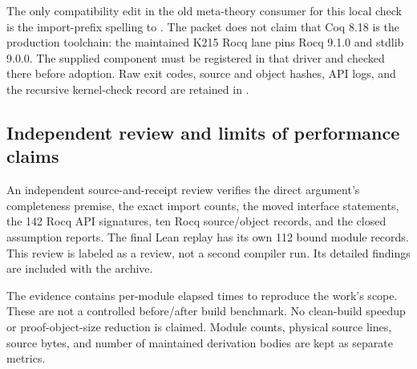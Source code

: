The only compatibility edit in the old meta-theory consumer for this local
check is the import-prefix spelling  to . The packet
does not claim that Coq 8.18 is the production toolchain: the maintained K215
Rocq lane pins Rocq 9.1.0 and stdlib 9.0.0. The supplied component must be
registered in that driver and checked there before adoption. Raw exit codes,
source and object hashes, API logs, and the recursive kernel-check record are
retained in .

\subsection{Independent review and limits of performance claims}

An independent source-and-receipt review verifies the direct argument's
completeness premise, the exact import counts, the moved interface statements,
the 142 Rocq API signatures, ten Rocq source/object records, and the closed
assumption reports. The final Lean replay has its own 112 bound module
records. This review is labeled as a review, not a second compiler
run. Its detailed findings are included with the archive.

The evidence contains per-module elapsed times to reproduce the work's scope.
These are not a controlled before/after build benchmark. No clean-build
speedup or proof-object-size reduction is claimed. Module counts, physical
source lines, source bytes, and number of maintained derivation bodies are
kept as separate metrics.
